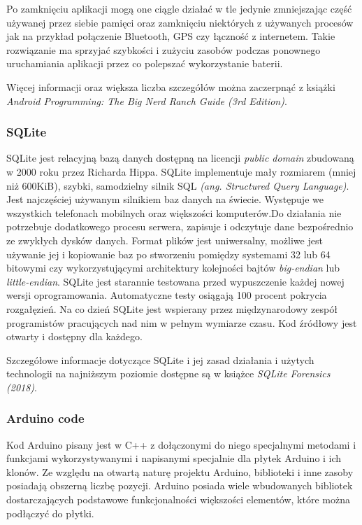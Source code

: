 \documentclass[a4paper,12pt, twoside]{article}
\begin{document}
	Po zamknięciu aplikacji mogą one ciągle działać w tle jedynie zmniejszając część używanej przez siebie pamięci oraz zamknięciu niektórych z używanych procesów jak na przykład połączenie Bluetooth, GPS czy łączność z internetem. Takie rozwiązanie ma sprzyjać szybkości i zużyciu zasobów podczas ponownego uruchamiania aplikacji przez co polepszać wykorzystanie baterii\cite{batterysave}.
	
	Więcej informacji oraz większa liczba szczegółów można zaczerpnąć z książki \textit{Android Programming: The Big Nerd Ranch Guide (3rd Edition)}\cite{androidprogramming}.
	
	\vspace{1cm}
	\subsubsection{SQLite}
	SQLite jest relacyjną bazą danych dostępną na licencji \textit{public domain}\cite{publicdomain} zbudowaną w 2000 roku przez Richarda Hippa. SQLite implementuje mały rozmiarem (mniej niż 600KiB), szybki, samodzielny  silnik SQL \textit{(ang. Structured Query Language)}. Jest najczęściej używanym silnikiem baz danych na świecie. Występuje we wszystkich telefonach mobilnych oraz większości komputerów.Do działania nie potrzebuje dodatkowego procesu serwera, zapisuje i odczytuje dane bezpośrednio ze zwykłych dysków danych. Format plików jest uniwersalny, możliwe jest używanie jej i kopiowanie baz po stworzeniu pomiędzy systemami 32 lub 64 bitowymi czy wykorzystującymi architektury kolejności bajtów \textit{big-endian} lub \textit{little-endian}\cite{endian}. SQLite jest starannie testowana przed wypuszczenie każdej nowej wersji oprogramowania. Automatyczne testy osiągają 100 procent pokrycia rozgałęzień\cite{branchcoverage}. Na co dzień SQLite jest wspierany przez międzynarodowy zespół programistów pracujących nad nim w pełnym wymiarze czasu. Kod źródłowy jest otwarty i dostępny dla każdego\cite{sqlite}.
	
	Szczegółowe informacje dotyczące SQLite i jej zasad działania i użytych technologii na najniższym poziomie dostępne są w książce \textit{SQLite Forensics (2018)}\cite{sqliteforensics}. 
	
	\vspace{1cm}
	\subsubsection{Arduino code}
	Kod Arduino pisany jest w C++ z dołączonymi do niego specjalnymi metodami i funkcjami wykorzystywanymi i napisanymi specjalnie dla płytek Arduino i ich klonów. Ze względu na otwartą naturę projektu Arduino, biblioteki i inne zasoby posiadają obszerną liczbę pozycji. Arduino posiada wiele wbudowanych bibliotek dostarczających podstawowe funkcjonalności większości elementów, które można podłączyć do płytki. 
	
\end{document}
